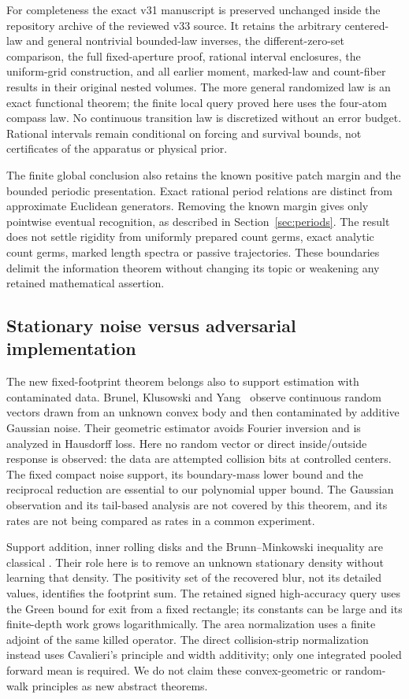 For completeness the exact v31 manuscript is preserved unchanged
inside the repository archive of the reviewed v33 source. It retains the arbitrary centered-law and general
nontrivial bounded-law inverses, the different-zero-set comparison,
the full fixed-aperture proof, rational interval enclosures, the
uniform-grid construction, and all earlier moment, marked-law and
count-fiber results in their original nested volumes. The more general
randomized law is an exact functional theorem; the finite local query
proved here uses the four-atom compass law. No continuous transition
law is discretized without an error budget. Rational intervals remain
conditional on forcing and survival bounds, not certificates of the
apparatus or physical prior.

The finite global conclusion also retains the known positive patch
margin and the bounded periodic presentation. Exact rational period
relations are distinct from approximate Euclidean generators. Removing
the known margin gives only pointwise eventual recognition, as described
in Section~\ref{sec:periods}. The result does not settle rigidity from
uniformly prepared count germs, exact analytic count germs, marked
length spectra or passive trajectories. These boundaries delimit the
information theorem without changing its topic or weakening any retained
mathematical assertion.

\subsection{Stationary noise versus adversarial implementation}
The new fixed-footprint theorem belongs also to support estimation with
contaminated data. Brunel, Klusowski and Yang~\cite{BKY} observe
continuous random vectors drawn from an unknown convex body and then
contaminated by additive Gaussian noise. Their geometric estimator
avoids Fourier inversion and is analyzed in Hausdorff loss. Here no
random vector or direct inside/outside response is observed: the data
are attempted collision bits at controlled centers. The fixed compact
noise support, its boundary-mass lower bound and the reciprocal reduction
are essential to our polynomial upper bound. The Gaussian observation
and its tail-based analysis are not covered by this theorem, and its
rates are not being compared as rates in a common experiment.

Support addition, inner rolling disks and the Brunn--Minkowski inequality
are classical \cite{Schneider}. Their role here is to remove an unknown
stationary density without learning that density. The positivity set of
the recovered blur, not its detailed values, identifies the footprint
sum. The retained signed high-accuracy query uses the Green bound for exit from a fixed
rectangle; its constants can be large and its finite-depth work grows
logarithmically. The area normalization uses a finite adjoint of the
same killed operator. The direct collision-strip normalization instead
uses Cavalieri's principle and width additivity; only one integrated
pooled forward mean is required. We do not claim these convex-geometric
or random-walk
principles as new abstract theorems.

